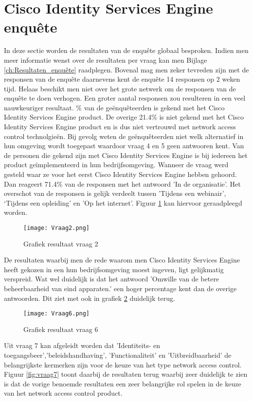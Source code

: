 \section{Cisco Identity Services Engine enquête}
\label{sec:enqueteISe}
In deze sectie worden de resultaten van de enquête globaal besproken. Indien men meer informatie wenst over de resultaten per vraag kan men Bijlage \ref{ch:Resultaten_enquête} raadplegen.
\newline
\newline
Bovenal mag men zeker tevreden zijn met de responsen van de enquête daarnevens kent de enquête 14 responsen op 2 weken tijd. Helaas beschikt men niet over het grote netwerk om de responsen van de enquête te doen verhogen. Een groter aantal responsen zou resulteren in een veel nauwkeuriger resultaat.  
\newline
{}\% van de geënquêteerden is gekend met het Cisco Identity Services Engine product. De overige 21.4\% is niet gekend met het Cisco Identity Services Engine product en is dus niet vertrouwd met network access control technolgieën. Bij gevolg weten de geënquêteerden niet welk alternatief in hun omgeving wordt toegepast waardoor vraag 4 en 5 geen antwooren kent. Van de personen die gekend zijn met Cisco Identity Services Engine is bij iedereen het product geïmplementeerd in hun bedrijfsomgeving. Wanneer de vraag werd gesteld waar ze voor het eerst Cisco Identity Services Engine hebben gehoord. Dan reageert 71.4\% van de responsen met het antwoord 'In de organisatie'. Het overschot van de responsen is gelijk verdeelt tussen 'Tijdens een webinair', ‘Tijdens een opleiding' en 'Op het internet'. Figuur \ref{fig:vraag2} kan hiervoor geraadpleegd worden. 
\begin{figure}[H]
	\centering
	\texttt{[image: Vraag2.png]}
	\caption{Grafiek resultaat vraag 2}
	\label{fig:vraag2}
\end{figure}
De resultaten waarbij men de rede waarom men Cisco Identity Services Engine heeft gekozen in een hun bedrijfsomgeving moest ingeven, ligt gelijkmatig verspreid. Wat wel duidelijk is dat het antwoord 'Omwille van de betere beheerbaarheid van eind apparaten.' een hoger percentage kent dan de overige antwoorden. Dit ziet met ook in grafiek \ref{fig:graf6} duidelijk terug.
\begin{figure}[H]
	\centering
	\texttt{[image: Vraag6.png]}
	\caption{Grafiek resultaat vraag 6}
	\label{fig:graf6}
\end{figure}
Uit vraag 7 kan afgeleidt worden dat 'Identiteits- en toegangsbeer','beleidshandhaving', 'Functionaliteit' en 'Uitbreidbaarheid' de belangrijkste kermerken zijn voor de keuze van het type network access control. Figuur \ref{fig:vraag7} toont daarbij de resultaten terug waarbij zeer duidelijk te zien is dat de vorige benoemde resultaten een zeer belangrijke rol spelen in de keuze van het network access control product. 

